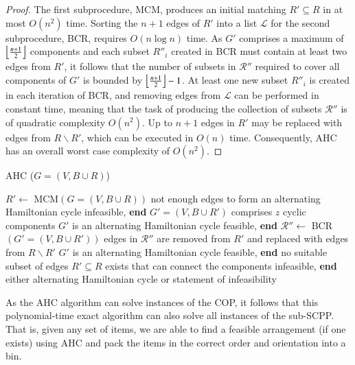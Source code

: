 \documentclass[a4paper,11pt,authoryear]{elsarticle}
\begin{document}
\begin{proof}
	The first subprocedure, MCM, produces an initial matching $R' \subseteq R$ in at most $O(n^2)$ time. Sorting the $n+1$ edges of $R'$ into a list $\mathcal{L}$ for the second subprocedure, BCR, requires $O(n\log n)$ time. As $G'$ comprises a maximum of $\floor*{\frac{n+1}{2}}$ components and each subset $R''_i$ created in BCR must contain at least two edges from $R'$, it follows that the number of subsets in $\mathcal{R}''$ required to cover all components of $G'$ is bounded by $\floor*{\frac{n+1}{2}}-1$. At least one new subset $R''_i$ is created in each iteration of BCR, and removing edges from $\mathcal{L}$ can be performed in constant time, meaning that the task of producing the collection of subsets $\mathcal{R}''$ is of quadratic complexity $O(n^2)$. Up to $n+1$ edges in $R'$ may be replaced with edges from $R \backslash R'$, which can be executed in $O(n)$ time. Consequently, AHC has an overall worst case complexity of $O(n^2)$. 
\end{proof}	

\begin{algorithm}[h]
\caption{AHC ($G = (V, B \cup R)$)}
\small
\begin{algorithmic}[1]
	\State $R' \gets$ MCM$(G = (V, B \cup R))$
		\State not enough edges to form an alternating Hamiltonian cycle
		\State infeasible, \textbf{end}
	\EndIf
	\State $G'=(V, B \cup R')$ comprises $z$ cyclic components
		\State $G'$ is an alternating Hamiltonian cycle
		\State feasible, \textbf{end}
	\EndIf
	\State $\mathcal{R}'' \gets$ BCR$(G'=(V, B \cup R'))$
		\State edges in $\mathcal{R}''$ are removed from $R'$ and replaced with edges from $R\backslash R'$
		\State $G'$ is an alternating Hamiltonian cycle
		\State feasible, \textbf{end}
	\Else
		\State no suitable subset of edges $R' \subseteq R$ exists that can connect the components
		\State infeasible, \textbf{end}
	\EndIf
	\Return either alternating Hamiltonian cycle or statement of infeasibility
\end{algorithmic}
\label{alg:ahc}	
\end{algorithm}

\noindent As the AHC algorithm can solve instances of the COP, it follows that this polynomial-time exact algorithm can also solve all instances of the sub-SCPP. That is, given any set of items, we are able to find a feasible arrangement (if one exists) using AHC and pack the items in the correct order and orientation into a bin.
\end{document}
